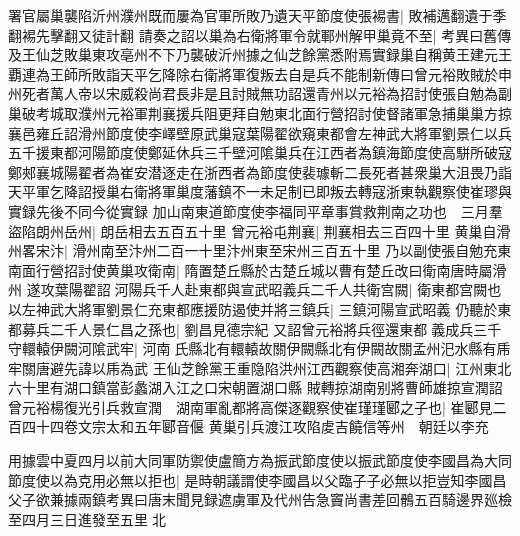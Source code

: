 署官屬巢襲陷沂州濮州既而屢為官軍所敗乃遺天平節度使張裼書|{
	敗補邁翻遺于季翻裼先擊翻又徒計翻}
請奏之詔以巢為右衛將軍令就鄆州解甲巢竟不至|{
	考異曰舊傳及王仙芝敗巢東攻亳州不下乃襲破沂州據之仙芝餘黨悉附焉實録巢自稱黄王建元王覇連為王師所敗詣天平乞降除右衛將軍復叛去自是兵不能制新傳曰曾元裕敗賊於申州死者萬人帝以宋威殺尚君長非是且討賊無功詔還青州以元裕為招討使張自勉為副巢破考城取濮州元裕軍荆襄援兵阻更拜自勉東北面行營招討使督諸軍急捕巢巢方掠襄邑雍丘詔滑州節度使李嶧壁原武巢寇葉陽翟欲窺東都會左神武大將軍劉景仁以兵五千援東都河陽節度使鄭延休兵三千壁河隂巢兵在江西者為鎮海節度使高駢所破寇鄭郟襄城陽翟者為崔安潜逐走在浙西者為節度使裴璩斬二長死者甚衆巢大沮畏乃詣天平軍乞降詔授巢右衛將軍巢度藩鎮不一未足制已即叛去轉寇浙東執觀察使崔璆與實録先後不同今從實録}
加山南東道節度使李福同平章事賞救荆南之功也　三月羣盜陷朗州岳州|{
	朗岳相去五百五十里}
曾元裕屯荆襄|{
	荆襄相去三百四十里}
黄巢自滑州畧宋汴|{
	滑州南至汴州二百一十里汴州東至宋州三百五十里}
乃以副使張自勉充東南面行營招討使黄巢攻衛南|{
	隋置楚丘縣於古楚丘城以曹有楚丘改曰衛南唐時屬滑州}
遂攻葉陽翟詔河陽兵千人赴東都與宣武昭義兵二千人共衛宫闕|{
	衛東都宫闕也}
以左神武大將軍劉景仁充東都應援防遏使并將三鎮兵|{
	三鎮河陽宣武昭義}
仍聽於東都募兵二千人景仁昌之孫也|{
	劉昌見德宗紀}
又詔曾元裕將兵徑還東都義成兵三千守轘轅伊闕河隂武牢|{
	河南氏縣北有轘轅故關伊闕縣北有伊闕故關孟州汜水縣有乕牢關唐避先諱以乕為武}
王仙芝餘黨王重隐陷洪州江西觀察使高湘奔湖口|{
	江州東北六十里有湖口鎮當彭蠡湖入江之口宋朝置湖口縣}
賊轉掠湖南别將曹師雄掠宣潤詔曾元裕楊復光引兵救宣潤　湖南軍亂都將高傑逐觀察使崔瑾瑾郾之子也|{
	崔郾見二百四十四卷文宗太和五年郾音偃}
黄巢引兵渡江攻陷䖍吉饒信等州　朝廷以李充

用據雲中夏四月以前大同軍防禦使盧簡方為振武節度使以振武節度使李國昌為大同節度使以為克用必無以拒也|{
	是時朝議謂使李國昌以父臨子子必無以拒豈知李國昌父子欲兼據兩鎮考異曰唐末聞見録遮虜軍及代州告急竇尚書差回鶻五百騎邊界廵檢至四月三日進發至五里北}


